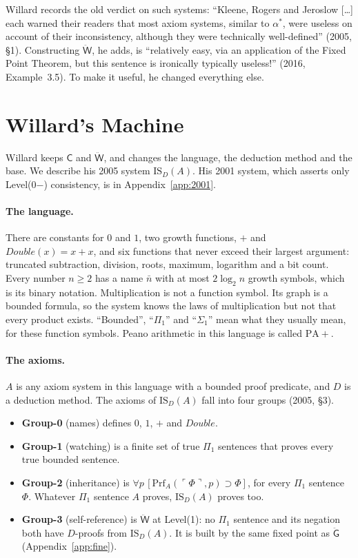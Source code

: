 \documentclass[11pt]{article}
\newcommand{\G}{\ddot{\mathsf{G}}}          %
\newcommand{\W}{\ddot{\mathsf{W}}}          %
\newcommand{\Prog}[1]{\mathsf{#1}}
\newcommand{\Prf}{\mathrm{Prf}}
\newcommand{\gn}[1]{\ulcorner #1\urcorner}  %
\newcommand{\ISD}{\mathrm{IS}_D(A)}
\theoremstyle{plain}
\theoremstyle{definition}
\begin{document}
Willard records the old verdict on such systems: ``Kleene, Rogers and
Jeroslow [\ldots] each warned their readers that most axiom systems, similar
to $\alpha^*$, were useless on account of their inconsistency, although they
were technically well-defined'' (2005, \S1). Constructing $\W$, he adds, is
``relatively easy, via an application of the Fixed Point Theorem, but this
sentence is ironically typically useless!'' (2016, Example~3.5). To make it
useful, he changed everything else.

\section{Willard's Machine}
\label{sec:machine}

Willard keeps $\Prog{C}$ and $\W$, and changes the language, the deduction
method and the base. We describe his 2005 system $\ISD$. His 2001 system,
which asserts only Level(0$-$) consistency, is in Appendix~\ref{app:2001}.

\paragraph{The language.} There are constants for $0$ and $1$, two growth
functions, $+$ and $\mathit{Double}(x) = x + x$, and six functions that
never exceed their largest argument: truncated subtraction, division, roots,
maximum, logarithm and a bit count. Every number $n \ge 2$ has a name
$\bar n$ with at most $2\log_2 n$ growth symbols, which is its binary
notation. Multiplication is not a function symbol. Its graph is a bounded
formula, so the system knows the laws of multiplication but not that every
product exists. ``Bounded'', ``$\Pi_1$'' and ``$\Sigma_1$'' mean what they
usually mean, for these function symbols. Peano arithmetic in this language
is called $\mathrm{PA}{+}$.

\paragraph{The axioms.} $A$ is any axiom system in this language with a
bounded proof predicate, and $D$ is a deduction method. The axioms of $\ISD$
fall into four groups (2005, \S3).
\begin{itemize}[leftmargin=1.5em]
\item \textbf{Group-0} (names) defines $0$, $1$, $+$ and $\mathit{Double}$.
\item \textbf{Group-1} (watching) is a finite set of true $\Pi_1$ sentences
  that proves every true bounded sentence.
\item \textbf{Group-2} (inheritance) is
  $\forall p\,[\Prf_A(\gn{\Phi}, p) \supset \Phi]$, for every $\Pi_1$ sentence
  $\Phi$. Whatever $\Pi_1$ sentence $A$ proves, $\ISD$ proves too.
\item \textbf{Group-3} (self-reference) is $\W$ at Level(1): no $\Pi_1$
  sentence and its negation both have $D$-proofs from $\ISD$. It is built by
  the same fixed point as $\G$ (Appendix~\ref{app:fine}).
\end{itemize}
\end{document}
